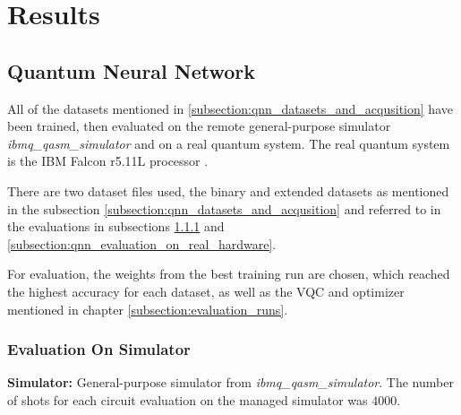 \chapter{Results} %

\label{chapter:results} %

\def \resultboxplot {0.8}


\section{Quantum Neural Network}
\label{chapter:results_qnn}
All of the datasets mentioned in \ref{subsection:qnn_datasets_and_acqusition} have been trained, then evaluated on the remote general-purpose simulator \textit{ibmq\_qasm\_simulator} and on a real quantum system. The real quantum system is the IBM Falcon r5.11L processor .\par
There are two dataset files used, the binary and extended datasets as mentioned in the subsection \ref{subsection:qnn_datasets_and_acqusition} and referred to in the evaluations in subsections \ref{subsection:qnn_evaluation_on_simulator} and \ref{subsection:qnn_evaluation_on_real_hardware}.\par
For evaluation, the weights from the best training run are chosen, which reached the highest accuracy for each dataset, as well as the VQC and optimizer mentioned in chapter \ref{subsection:evaluation_runs}.
 
\clearpage
\subsection{Evaluation On Simulator}
\label{subsection:qnn_evaluation_on_simulator}
\textbf{Simulator:} General-purpose simulator from  \textit{ibmq\_qasm\_simulator}. The number of shots for each circuit evaluation on the managed simulator was $4000$.

